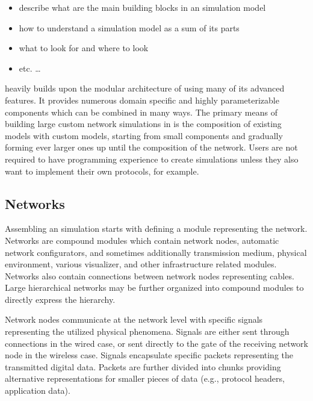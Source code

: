 \begin{itemize}
	\item	describe what are the main building blocks in an \inet simulation model
	\item	how to understand a simulation model as a sum of its parts
	\item	what to look for and where to look
	\item	etc. \ldots
\end{itemize}

\inet heavily builds upon the modular architecture of \omnet using many of its advanced features. It provides numerous domain specific and highly parameterizable components which can be combined in many ways. The primary means of building large custom network simulations in \inet is the composition of existing models with custom models, starting from small components and gradually forming ever larger ones up until the composition of the network. Users are not required to have programming experience to create simulations unless they also want to implement their own protocols, for example.

\subsection{Networks}
\label{subsec:networks}



Assembling an \inet simulation starts with defining a module representing the network. Networks are compound modules which contain network nodes, automatic network configurators, and sometimes additionally transmission medium, physical environment, various visualizer, and other infrastructure related modules. Networks also contain connections between network nodes representing cables. Large hierarchical networks may be further organized into compound modules to directly express the hierarchy.

Network nodes communicate at the network level with \inet specific signals representing the utilized physical phenomena. Signals are either sent through \omnet connections in the wired case, or sent directly to the gate of the receiving network node in the wireless case. Signals encapsulate \inet specific packets representing the transmitted digital data. Packets are further divided into chunks providing alternative representations for smaller pieces of data (e.g., protocol headers, application data).

